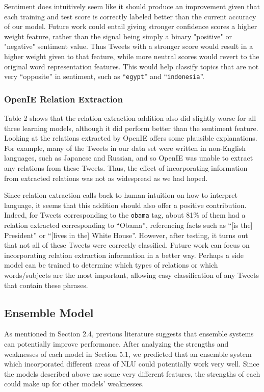 \documentclass[11pt]{article}
\begin{document}
Sentiment does intuitively seem like it should produce an improvement given that each training and test score is correctly labeled better than the current accuracy of our model. Future work could entail giving stronger confidence scores a higher weight feature, rather than the signal being simply a binary "positive" or "negative" sentiment value. Thus Tweets with a stronger score would result in a higher weight given to that feature, while more neutral scores would revert to the original word representation features. This would help classify topics that are not very ``opposite'' in sentiment, such as ``\texttt{egypt}'' and ``\texttt{indonesia}''.

\subsubsection{OpenIE Relation Extraction}

Table 2 shows that the relation extraction addition also did slightly worse for all three learning models, although it did perform better than the sentiment feature. Looking at the relations extracted by OpenIE offers some plausible explanations. For example, many of the Tweets in our data set were written in non-English languages, such as Japanese and Russian, and so OpenIE was unable to extract any relations from these Tweets. Thus, the effect of incorporating information from extracted relations was not as widespread as we had hoped.

Since relation extraction calls back to human intuition on how to interpret language, it seems that this addition should also offer a positive contribution. Indeed, for Tweets corresponding to the \texttt{obama} tag, about 81\% of them had a relation extracted corresponding to ``Obama'', referencing facts such as ``[is the] President'' or ``[lives in the] White House''. However, after testing, it turns out that not all of these Tweets were correctly classified. Future work can focus on incorporating relation extraction information in a better way. Perhaps a side model can be trained to determine which types of relations or which words/subjects are the most important, allowing easy classification of any Tweets that contain these phrases.

\subsection{Ensemble Model}

As mentioned in Section 2.4, previous literature suggests that ensemble systems can potentially improve performance. After analyzing the strengths and weaknesses of each model in Section 5.1, we predicted that an ensemble system which incorporated different areas of NLU could potentially work very well. Since the models described above use some very different features, the strengths of each could make up for other models' weaknesses.
\end{document}
